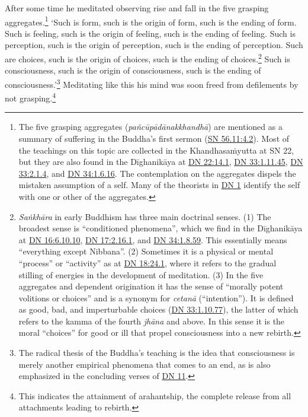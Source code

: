 \documentclass[12pt,openany]{book}%
\begin{document}
After some time he meditated observing rise and fall in the five grasping aggregates.\footnote{The five grasping aggregates (\textit{\textsanskrit{pañcūpādānakkhandhā}}) are mentioned as a summary of suffering in the Buddha’s first sermon (\href{https://suttacentral.net/sn56.11/en/sujato\#4.2}{SN 56.11:4.2}). Most of the teachings on this topic are collected in the \textsanskrit{Khandhasaṁyutta} at SN 22, but they are also found in the \textsanskrit{Dīghanikāya} at \href{https://suttacentral.net/dn22/en/sujato\#14.1}{DN 22:14.1}, \href{https://suttacentral.net/dn33/en/sujato\#1.11.45}{DN 33:1.11.45}, \href{https://suttacentral.net/dn33/en/sujato\#2.1.4}{DN 33:2.1.4}, and \href{https://suttacentral.net/dn34/en/sujato\#1.6.16}{DN 34:1.6.16}. The contemplation on the aggregates dispels the mistaken assumption of a self. Many of the theorists in \href{https://suttacentral.net/dn1/en/sujato}{DN 1} identify the self with one or other of the aggregates. } ‘Such is form, such is the origin of form, such is the ending of form. Such is feeling, such is the origin of feeling, such is the ending of feeling. Such is perception, such is the origin of perception, such is the ending of perception. Such are choices, such is the origin of choices, such is the ending of choices.\footnote{\textit{\textsanskrit{Saṅkhāra}} in early Buddhism has three main doctrinal senses. (1) The broadest sense is “conditioned phenomena”, which we find in the \textsanskrit{Dīghanikāya} at \href{https://suttacentral.net/dn16/en/sujato\#6.10.10}{DN 16:6.10.10}, \href{https://suttacentral.net/dn17/en/sujato\#2.16.1}{DN 17:2.16.1}, and \href{https://suttacentral.net/dn34/en/sujato\#1.8.59}{DN 34:1.8.59}. This essentially means “everything except Nibbana”. (2) Sometimes it is a physical or mental “process” or “activity” as at \href{https://suttacentral.net/dn18/en/sujato\#24.1}{DN 18:24.1}, where it refers to the gradual stilling of energies in the development of meditation. (3) In the five aggregates and dependent origination it has the sense of “morally potent volitions or choices” and is a synonym for \textit{\textsanskrit{cetanā}} (“intention”). It is defined as good, bad, and imperturbable choices (\href{https://suttacentral.net/dn33/en/sujato\#1.10.77}{DN 33:1.10.77}), the latter of which refers to the kamma of the fourth \textit{\textsanskrit{jhāna}} and above. In this sense it is the moral “choices” for good or ill that propel consciousness into a new rebirth. } Such is consciousness, such is the origin of consciousness, such is the ending of consciousness.’\footnote{The radical thesis of the Buddha’s teaching is the idea that consciousness is merely another empirical phenomena that comes to an end, as is also emphasized in the concluding verses of \href{https://suttacentral.net/dn11/en/sujato}{DN 11}. } Meditating like this his mind was soon freed from defilements by not grasping.\footnote{This indicates the attainment of arahantship, the complete release from all attachments leading to rebirth. } 
\end{document}
